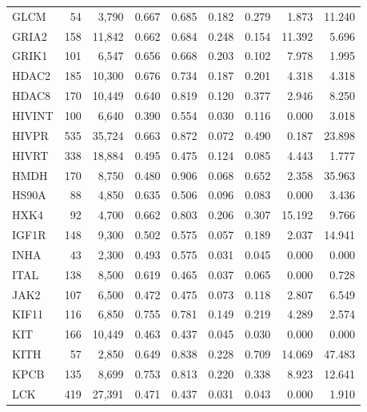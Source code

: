 \begin{center}
\begin{longtable}{@{}lrrrrrrrr@{}}
    GLCM   & 54    & 3,790    & 0.667   & 0.685   & 0.182   & 0.279   & 1.873   & 11.240 \\
    GRIA2  & 158   & 11,842   & 0.662   & 0.684   & 0.248   & 0.154   & 11.392  & 5.696  \\
    GRIK1  & 101   & 6,547    & 0.656   & 0.668   & 0.203   & 0.102   & 7.978   & 1.995  \\
    HDAC2  & 185   & 10,300   & 0.676   & 0.734   & 0.187   & 0.201   & 4.318   & 4.318  \\
    HDAC8  & 170   & 10,449   & 0.640   & 0.819   & 0.120   & 0.377   & 2.946   & 8.250  \\
    HIVINT & 100   & 6,640    & 0.390   & 0.554   & 0.030   & 0.116   & 0.000   & 3.018  \\
    HIVPR  & 535   & 35,724   & 0.663   & 0.872   & 0.072   & 0.490   & 0.187   & 23.898 \\
    HIVRT  & 338   & 18,884   & 0.495   & 0.475   & 0.124   & 0.085   & 4.443   & 1.777  \\
    HMDH   & 170   & 8,750    & 0.480   & 0.906   & 0.068   & 0.652   & 2.358   & 35.963 \\
    HS90A  & 88    & 4,850    & 0.635   & 0.506   & 0.096   & 0.083   & 0.000   & 3.436  \\
    HXK4   & 92    & 4,700    & 0.662   & 0.803   & 0.206   & 0.307   & 15.192  & 9.766  \\
    IGF1R  & 148   & 9,300    & 0.502   & 0.575   & 0.057   & 0.189   & 2.037   & 14.941 \\
    INHA   & 43    & 2,300    & 0.493   & 0.575   & 0.031   & 0.045   & 0.000   & 0.000  \\
    ITAL   & 138   & 8,500    & 0.619   & 0.465   & 0.037   & 0.065   & 0.000   & 0.728  \\
    JAK2   & 107   & 6,500    & 0.472   & 0.475   & 0.073   & 0.118   & 2.807   & 6.549  \\
    KIF11  & 116   & 6,850    & 0.755   & 0.781   & 0.149   & 0.219   & 4.289   & 2.574  \\
    KIT    & 166   & 10,449   & 0.463   & 0.437   & 0.045   & 0.030   & 0.000   & 0.000  \\
    KITH   & 57    & 2,850    & 0.649   & 0.838   & 0.228   & 0.709   & 14.069  & 47.483 \\
    KPCB   & 135   & 8,699    & 0.753   & 0.813   & 0.220   & 0.338   & 8.923   & 12.641 \\
    LCK    & 419   & 27,391   & 0.471   & 0.437   & 0.031   & 0.043   & 0.000   & 1.910  \\

\end{longtable}
\end{center}
